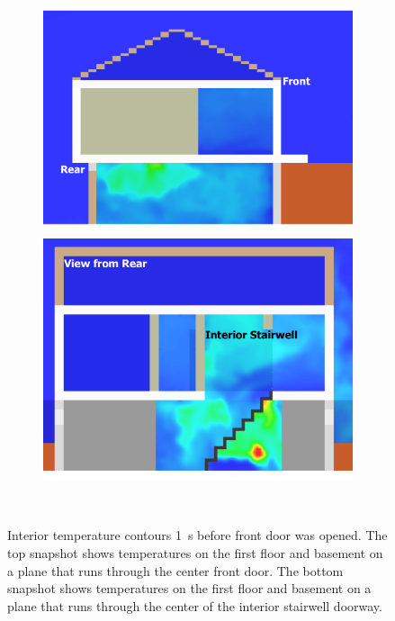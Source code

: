 \documentclass[12pt,oneside]{book}
\begin{document}
\begin{figure}[!ht]
\begin{subfigure}{0.65\textwidth}
\includegraphics[trim = 0in 0in 0in 0in, clip=true, width=\textwidth]{../Figures/side_view_99s} \\
\includegraphics[trim = 0in 0in 0in 0in, clip=true, width=\textwidth]{../Figures/stair_view_99s} 
\end{subfigure}
\begin{subfigure}{0.35\textwidth}

 \\
\end{subfigure}
\caption[Interior temperature contours 1~s before front door was opened]
{Interior temperature contours 1~s before front door was opened. The top snapshot shows temperatures on the first floor and basement on a plane that runs through the center front door. The bottom snapshot shows temperatures on the first floor and basement on a plane that runs through the center of the interior stairwell doorway.}
\label{fig:int_temp_99s}
\end{figure}
\end{document}
